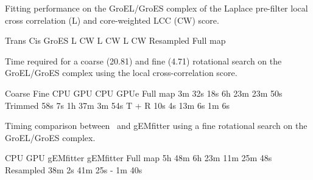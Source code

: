 \caption{}{Fitting performance on the GroEL/GroES complex of the Laplace
pre-filter local cross correlation (L) and core-weighted LCC (CW)
score.}
\stopbuffer

\bTABLE
\setupTABLE[r][1,2][style=table:head, background=color, 
    backgroundcolor=tableheadcolor]
\setupTABLE[c][1][width=8em]
\bTABLEhead
\bTR \bTD[nr=2] \eTD \bTD[nc=2] Trans \eTD \bTD[nc=2] Cis \eTD \bTD[nc=2] GroES \eTD \eTR
\bTR \bTD L \eTD \bTD CW \eTD \bTD L \eTD \bTD CW \eTD \bTD L \eTD \bTD CW \eTD \eTR
\eTABLEhead
\bTABLEbody
\bTR \bTD Resampled \eTD {} \eTD {} \eTD {} \eTD {} \eTD {} \eTD {} \eTD \eTR
\bTR \bTD Full map \eTD {} \eTD {} \eTD {} \eTD {} \eTD {} \eTD {} \eTD \eTR
\eTABLEbody
\eTABLE
\stopbuffer


\caption{}
{Time required for a coarse (20.81\Deg) and fine (4.71\Deg) rotational search on the
GroEL/GroES complex using the local cross-correlation score.}
\stopbuffer

\bTABLE
\setupTABLE[r][1,2][style=table:head, background=color, 
    backgroundcolor=tableheadcolor]
\bTABLEhead
\bTR \bTD[nr=2]  \eTD \bTD[nc=2] Coarse \eTD \bTD[nc=2] Fine \eTD \eTR
\bTR \bTD CPU \eTD \bTD GPU \eTD \bTD CPU \eTD \bTD  GPUe \eTD \eTR
\eTABLEhead
\bTABLEbody
\bTR \bTD Full map \eTD \bTD 3m 32s  \eTD \bTD 18s \eTD \bTD 6h 23m  \eTD \bTD 23m 50s \eTD \eTR
\bTR \bTD Trimmed  \eTD \bTD 58s     \eTD \bTD 7s  \eTD \bTD 1h 37m  \eTD \bTD 3m 54s  \eTD \eTR
\bTR \bTD T + R    \eTD \bTD 10s     \eTD \bTD 4s  \eTD \bTD 13m 6s  \eTD \bTD 1m 6s   \eTD \eTR
\eTABLEbody
\eTABLE
\stopbuffer


\caption{}
{Timing comparison between \powerfit\ and gEMfitter using a fine rotational search on the GroEL/GroES complex.}
\stopbuffer

\bTABLE
\setupTABLE[r][1,2][style=table:head, background=color, 
    backgroundcolor=tableheadcolor]
\bTR \bTD[nr=2] \eTD \bTD[nc=2] CPU \eTD \bTD[nc=2] GPU \eTD \eTR
\bTR \bTD gEMfitter \eTD \bTD \powerfit \eTD \bTD gEMfitter \eTD \bTD \powerfit \eTD \eTR
\bTR \bTD Full map \eTD \bTD 5h 48m \eTD \bTD 6h 23m \eTD \bTD 11m \eTD \bTD 25m 48s \eTD \eTR
\bTR \bTD Resampled \eTD \bTD 38m 2s \eTD \bTD 41m 25s \eTD \bTD - \eTD \bTD 1m 40s \eTD \eTR
\eTABLE
\stopbuffer


